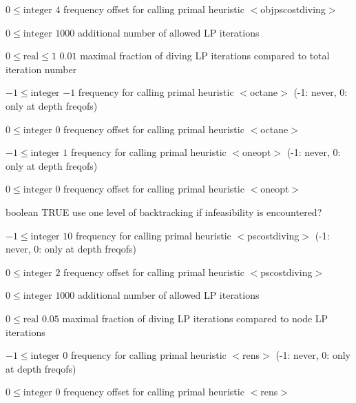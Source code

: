 %
{$0\leq\textrm{integer}$}%
{$4$}%
{frequency offset for calling primal heuristic $<$objpscostdiving$>$}%
{}

%
{$0\leq\textrm{integer}$}%
{$1000$}%
{additional number of allowed LP iterations}%
{}

%
{$0\leq\textrm{real}\leq1$}%
{$0.01$}%
{maximal fraction of diving LP iterations compared to total iteration number}%
{}

%
{$-1\leq\textrm{integer}$}%
{$-1$}%
{frequency for calling primal heuristic $<$octane$>$ (-1: never, 0: only at depth freqofs)}%
{}

%
{$0\leq\textrm{integer}$}%
{$0$}%
{frequency offset for calling primal heuristic $<$octane$>$}%
{}

%
{$-1\leq\textrm{integer}$}%
{$1$}%
{frequency for calling primal heuristic $<$oneopt$>$ (-1: never, 0: only at depth freqofs)}%
{}

%
{$0\leq\textrm{integer}$}%
{$0$}%
{frequency offset for calling primal heuristic $<$oneopt$>$}%
{}

%
{boolean}%
{TRUE}%
{use one level of backtracking if infeasibility is encountered?}%
{}

%
{$-1\leq\textrm{integer}$}%
{$10$}%
{frequency for calling primal heuristic $<$pscostdiving$>$ (-1: never, 0: only at depth freqofs)}%
{}

%
{$0\leq\textrm{integer}$}%
{$2$}%
{frequency offset for calling primal heuristic $<$pscostdiving$>$}%
{}

%
{$0\leq\textrm{integer}$}%
{$1000$}%
{additional number of allowed LP iterations}%
{}

%
{$0\leq\textrm{real}$}%
{$0.05$}%
{maximal fraction of diving LP iterations compared to node LP iterations}%
{}

%
{$-1\leq\textrm{integer}$}%
{$0$}%
{frequency for calling primal heuristic $<$rens$>$ (-1: never, 0: only at depth freqofs)}%
{}

%
{$0\leq\textrm{integer}$}%
{$0$}%
{frequency offset for calling primal heuristic $<$rens$>$}%
{}

